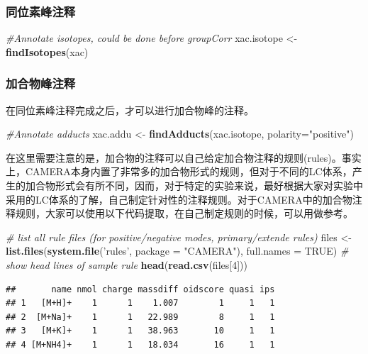 \documentclass[]{ctexbook}
\newenvironment{Shaded}{\begin{snugshade}}{\end{snugshade}}
\newcommand{\CommentTok}[1]{\textcolor[rgb]{0.56,0.35,0.01}{\textit{#1}}}
\newcommand{\DataTypeTok}[1]{\textcolor[rgb]{0.13,0.29,0.53}{#1}}
\newcommand{\DecValTok}[1]{\textcolor[rgb]{0.00,0.00,0.81}{#1}}
\newcommand{\KeywordTok}[1]{\textcolor[rgb]{0.13,0.29,0.53}{\textbf{#1}}}
\newcommand{\NormalTok}[1]{#1}
\newcommand{\OtherTok}[1]{\textcolor[rgb]{0.56,0.35,0.01}{#1}}
\newcommand{\StringTok}[1]{\textcolor[rgb]{0.31,0.60,0.02}{#1}}
\begin{document}
\subsubsection{同位素峰注释}

\begin{Shaded}
\begin{Highlighting}[]
\CommentTok{#Annotate isotopes, could be done before groupCorr}
\NormalTok{xac.isotope <-}\StringTok{ }\KeywordTok{findIsotopes}\NormalTok{(xac)}
\end{Highlighting}
\end{Shaded}

\subsubsection{加合物峰注释}

在同位素峰注释完成之后，才可以进行加合物峰的注释。

\begin{Shaded}
\begin{Highlighting}[]
\CommentTok{#Annotate adducts}
\NormalTok{xac.addu <-}\StringTok{ }\KeywordTok{findAdducts}\NormalTok{(xac.isotope, }\DataTypeTok{polarity=}\StringTok{"positive"}\NormalTok{)}
\end{Highlighting}
\end{Shaded}

在这里需要注意的是，加合物的注释可以自己给定加合物注释的规则(rules)。事实上，CAMERA本身内置了非常多的加合物形式的规则，但对于不同的LC体系，产生的加合物形式会有所不同，因而，对于特定的实验来说，最好根据大家对实验中采用的LC体系的了解，自己制定针对性的注释规则。对于CAMERA中的加合物注释规则，大家可以使用以下代码提取，在自己制定规则的时候，可以用做参考。

\begin{Shaded}
\begin{Highlighting}[]
\CommentTok{# list all rule files (for positive/negative modes, primary/extende rules)}
\NormalTok{files <-}\StringTok{ }\KeywordTok{list.files}\NormalTok{(}\KeywordTok{system.file}\NormalTok{(}\StringTok{'rules'}\NormalTok{, }\DataTypeTok{package =} \StringTok{"CAMERA"}\NormalTok{), }\DataTypeTok{full.names =} \OtherTok{TRUE}\NormalTok{)}
\CommentTok{# show head lines of sample rule}
\KeywordTok{head}\NormalTok{(}\KeywordTok{read.csv}\NormalTok{(files[}\DecValTok{4}\NormalTok{]))}
\end{Highlighting}
\end{Shaded}

\begin{verbatim}
##       name nmol charge massdiff oidscore quasi ips
## 1   [M+H]+    1      1    1.007        1     1   1
## 2  [M+Na]+    1      1   22.989        8     1   1
## 3   [M+K]+    1      1   38.963       10     1   1
## 4 [M+NH4]+    1      1   18.034       16     1   1
\end{verbatim}
\end{document}
